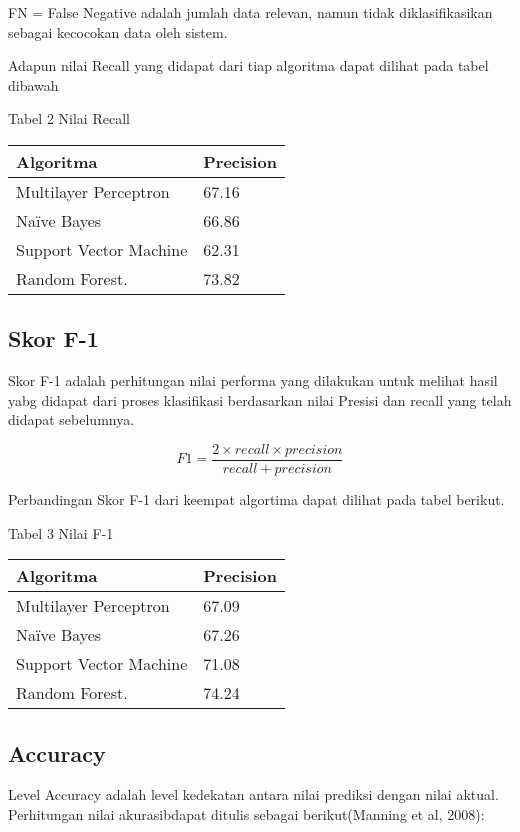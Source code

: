\documentclass{article}
\begin{document}
FN = False Negative adalah jumlah data relevan, namun tidak diklasifikasikan sebagai 
kecocokan data oleh sistem.

Adapun nilai Recall yang didapat dari tiap algoritma dapat dilihat pada tabel dibawah

\begin{center}
Tabel 2 Nilai Recall

\begin{tabular}{ |p{5cm}||p{3cm}|  }
 \hline
 Algoritma & Precision \\
 \hline
 Multilayer Perceptron   & 67.16    \\
 Naïve Bayes &   66.86  \\
 Support Vector Machine & 62.31 \\
 Random Forest.    & 73.82 \\
 \hline
\end{tabular}
\end{center}

\subsection{ Skor F-1}
Skor F-1 adalah perhitungan nilai performa yang dilakukan untuk melihat hasil yabg 
didapat dari proses klasifikasi berdasarkan nilai Presisi dan recall yang telah didapat 
sebelumnya.

$$ F1 =\frac{2 \times recall \times precision}{recall + precision}$$

Perbandingan Skor F-1 dari keempat algortima dapat dilihat pada tabel 
berikut.

\begin{center}
Tabel 3 Nilai F-1

\begin{tabular}{ |p{5cm}||p{3cm}|  }
 \hline
 Algoritma & Precision \\
 \hline
 Multilayer Perceptron   & 67.09    \\
 Naïve Bayes &   67.26  \\
 Support Vector Machine & 71.08 \\
 Random Forest.  & 74.24 \\
 \hline
\end{tabular}
\end{center}

\subsection{Accuracy}
Level Accuracy adalah level kedekatan antara nilai prediksi dengan nilai aktual.
Perhitungan nilai akurasibdapat ditulis sebagai berikut(Manning et al, 2008):
\end{document}
